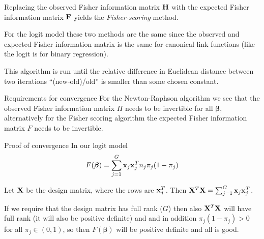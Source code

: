 \documentclass[
  ignorenonframetext,
]{beamer}
\begin{document}
\begin{frame}
Replacing the observed Fisher information matrix \({\bf H}\) with the
expected Fisher information matrix \({\bf F}\) yields the
\emph{Fisher-scoring} method.

For the logit model these two methods are the same since the observed
and expected Fisher information matrix is the same for canonical link
functions (like the logit is for binary regression).

This algorithm is run until the relative difference in Euclidean
distance between two iterations ``(new-old)/old'' is smaller than some
chosen constant.
\end{frame}

\begin{frame}
\begin{block}{Requirements for convergence}
\label{requirements-for-convergence}
For the Newton-Raphson algorithm we see that the observed Fisher
information matrix \(H\) needs to be invertible for all
\(\boldsymbol{\beta}\), alternatively for the Fisher scoring algorithm
the expected Fisher information matrix \(F\) needs to be invertible.
\end{block}
\end{frame}

\begin{frame}
\begin{block}{Proof of convergence}
\label{proof-of-convergence}
In our logit model
\[F(\boldsymbol{\beta})=\sum_{j=1}^G {\bf x}_j {\bf x}_j^T n_j \pi_j (1-\pi_j)\]

Let \({\bf X}\) be the design matrix, where the rows are
\({\bf x}_j^T\). Then
\({\bf X}^T{\bf X}=\sum_{j=1}^G {\bf x}_j {\bf x}_j^T\).

If we require that the design matrix has full rank (\(G\)) then also
\({\bf X}^T{\bf X}\) will have full rank (it will also be positive
definite) and and in addition \(\pi_j(1-\pi_j)>0\) for all
\(\pi_j \in (0,1)\), so then \(F(\boldsymbol{\beta})\) will be positive
definite and all is good.
\end{block}
\end{frame}
\end{document}

